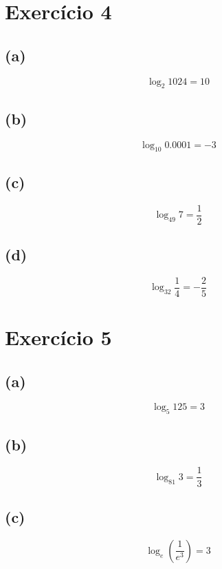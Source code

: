 \documentclass{article}
\begin{document}
\section{Exercício 4}
\subsection*{(a)}
\begin{equation}
	\log_2 1024 = 10
\end{equation}

\subsection*{(b)}
\begin{equation}
	\log_{10} 0.0001 = -3
\end{equation}

\subsection*{(c)}
\begin{equation}
	\log_{49} 7 = \dfrac{1}{2} 
\end{equation}

\subsection*{(d)}
\begin{equation}
	\log_{32} \dfrac{1}{4}  = -\dfrac{2}{5} 
\end{equation}

\section{Exercício 5}
\subsection*{(a)}
\begin{equation}
	\log_5 125  = 3
\end{equation}

\subsection*{(b)}
\begin{equation}
	\log_{81} 3  = \dfrac{1}{3}
\end{equation}

\subsection*{(c)}
\begin{equation}
	\log_e (\dfrac{1}{e^3})  = 3
\end{equation}
\end{document}
